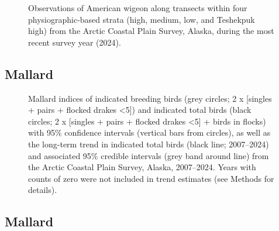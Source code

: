 \documentclass[
]{article}
\begin{document}
\begin{figure}


\caption{\label{fig-AMWImap}Observations of American wigeon along
transects within four physiographic-based strata (high, medium, low, and
Teshekpuk high) from the Arctic Coastal Plain Survey, Alaska, during the
most recent survey year (2024).}

\end{figure}%

\newpage{}

\subsection*{Mallard}\label{mallard}

\begin{figure}


\caption{\label{fig-MALL}Mallard indices of indicated breeding birds
(grey circles; 2 x {[}singles + pairs + flocked drakes \textless5{]})
and indicated total birds (black circles; 2 x {[}singles + pairs +
flocked drakes \textless5{]} + birds in flocks) with 95\% confidence
intervals (vertical bars from circles), as well as the long-term trend
in indicated total birds (black line; 2007--2024) and associated 95\%
credible intervals (grey band around line) from the Arctic Coastal Plain
Survey, Alaska, 2007--2024. Years with counts of zero were not included
in trend estimates (see Methods for details).}

\end{figure}%

\newpage{}

\subsection*{Mallard}\label{mallard-1}

\begingroup\fontsize{10}{12}\selectfont
\end{document}
